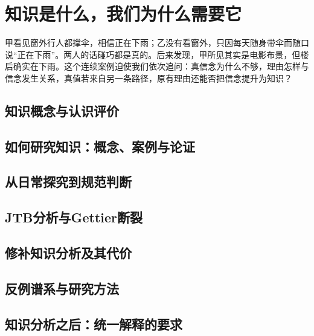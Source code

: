 \chapter{知识是什么，我们为什么需要它}

\begin{openingcase}
甲看见窗外行人都撑伞，相信正在下雨；乙没有看窗外，只因每天随身带伞而随口说“正在下雨”。两人的话碰巧都是真的。后来发现，甲所见其实是电影布景，但楼后确实在下雨。这个连续案例迫使我们依次追问：真信念为什么不够，理由怎样与信念发生关系，真值若来自另一条路径，原有理由还能否把信念提升为知识？
\end{openingcase}

\section{知识概念与认识评价}


\section{如何研究知识：概念、案例与论证}


\section{从日常探究到规范判断}



\section{JTB分析与Gettier断裂}


\section{修补知识分析及其代价}


\section{反例谱系与研究方法}



\section{知识分析之后：统一解释的要求}


